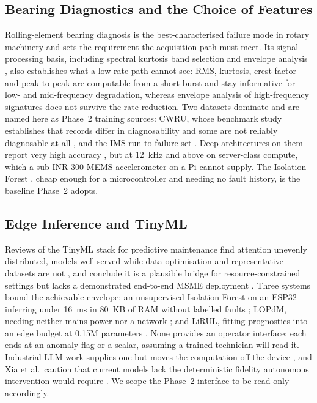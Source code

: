 \documentclass[conference]{IEEEtran}
\begin{document}
\subsection{Bearing Diagnostics and the Choice of Features}

Rolling-element bearing diagnosis is the best-characterised failure mode in
rotary machinery and sets the requirement the acquisition path must meet.
Its signal-processing basis, including spectral kurtosis band selection and
envelope analysis \cite{b9}, also establishes what a low-rate path cannot
see: RMS, kurtosis, crest factor and peak-to-peak are computable from a
short burst and stay informative for low- and mid-frequency degradation,
whereas envelope analysis of high-frequency signatures does not survive the
rate reduction. Two datasets dominate and are named here as Phase~2 training
sources: CWRU, whose benchmark study establishes that records differ in
diagnosability and some are not reliably diagnosable at all \cite{b7}, and
the IMS run-to-failure set \cite{b8}. Deep architectures on them report very
high accuracy \cite{b10,b11,b13}, but at 12~kHz and above on server-class
compute, which a sub-INR-300 MEMS accelerometer on a Pi cannot supply. The
Isolation Forest \cite{b12}, cheap enough for a microcontroller and needing
no fault history, is the baseline Phase~2 adopts.

\subsection{Edge Inference and TinyML}

Reviews of the TinyML stack for predictive maintenance find attention
unevenly distributed, models well served while data optimisation and
representative datasets are not \cite{b15}, and conclude it is a plausible
bridge for resource-constrained settings but lacks a demonstrated end-to-end
MSME deployment \cite{b35}. Three systems bound the achievable envelope: an
unsupervised Isolation Forest on an ESP32 inferring under 16~ms in 80~KB of
RAM without labelled faults \cite{b16}; LOPdM, needing neither mains power
nor a network \cite{b17}; and LiRUL, fitting prognostics into an edge budget
at 0.15M parameters \cite{b20}. None provides an operator interface: each
ends at an anomaly flag or a scalar, assuming a trained technician will read
it. Industrial LLM work supplies one but moves the computation off the
device \cite{b24,b25,b26}, and Xia et al.\ caution that current models lack
the deterministic fidelity autonomous intervention would require \cite{b27}.
We scope the Phase~2 interface to be read-only accordingly.
\end{document}
